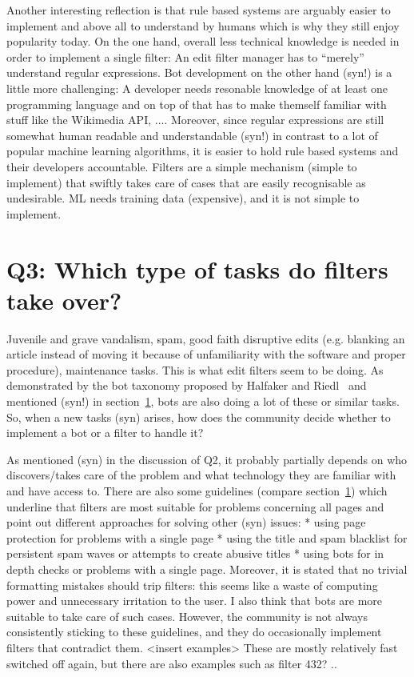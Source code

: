Another interesting reflection is that rule based systems are arguably easier to implement and above all to understand by humans which is why they still enjoy popularity today.
On the one hand, overall less technical knowledge is needed in order to implement a single filter:
An edit filter manager has to ``merely'' understand regular expressions.
Bot development on the other hand (syn!) is a little more challenging:
A developer needs resonable knowledge of at least one programming language and on top of that has to make themself familiar with stuff like the Wikimedia API, ....
Moreover, since regular expressions are still somewhat human readable and understandable (syn!) in contrast to a lot of popular machine learning algorithms, it is easier to hold rule based systems and their developers accountable.
Filters are a simple mechanism (simple to implement) that swiftly takes care of cases that are easily recognisable as undesirable.
ML needs training data (expensive), and it is not simple to implement.


\section{Q3: Which type of tasks do filters take over?}

Juvenile and grave vandalism, spam, good faith disruptive edits (e.g. blanking an article instead of moving it because of unfamiliarity with the software and proper procedure), maintenance tasks.
This is what edit filters seem to be doing.
As demonstrated by the bot taxonomy proposed by Halfaker and Riedl~\cite{} and mentioned (syn!) in section~\ref{}, bots are also doing a lot of these or similar tasks.
So, when a new tasks (syn) arises, how does the community decide whether to implement a bot or a filter to handle it?

As mentioned (syn) in the discussion of Q2, it probably partially depends on who discovers/takes care of the problem and what technology they are familiar with and have access to.
There are also some guidelines (compare section~\ref{}) which underline that filters are most suitable for problems concerning all pages and point out different approaches for solving other (syn) issues:
* using page protection for problems with a single page
* using the title and spam blacklist for persistent spam waves or attempts to create abusive titles
* using bots for in depth checks or problems with a single page.
Moreover, it is stated that no trivial formatting mistakes should trip filters\cite{Wikipedia:EditFilterRequested}: this seems like a waste of computing power and unnecessary irritation to the user.
I also think that bots are more suitable to take care of such cases.
However, the community is not always consistently sticking to these guidelines, and they do occasionally implement filters that contradict them.
<insert examples>
These are mostly relatively fast switched off again, but there are also examples such as filter 432? .. %

